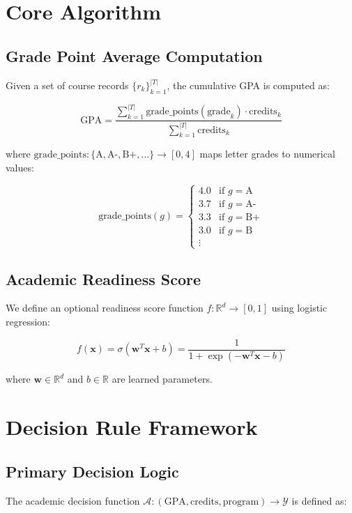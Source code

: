 \documentclass[11pt]{article}
\begin{document}
\section{Core Algorithm}

\subsection{Grade Point Average Computation}
Given a set of course records $\{r_k\}_{k=1}^{|T|}$, the cumulative GPA is computed as:

\begin{equation}
\text{GPA} = \frac{\sum_{k=1}^{|T|} \text{grade\_points}(\text{grade}_k) \cdot \text{credits}_k}{\sum_{k=1}^{|T|} \text{credits}_k}
\end{equation}

where $\text{grade\_points}: \{\text{A}, \text{A-}, \text{B+}, \ldots\} \rightarrow [0, 4]$ maps letter grades to numerical values:

\begin{equation}
\text{grade\_points}(g) = \begin{cases}
4.0 & \text{if } g = \text{A} \\
3.7 & \text{if } g = \text{A-} \\
3.3 & \text{if } g = \text{B+} \\
3.0 & \text{if } g = \text{B} \\
\vdots
\end{cases}
\end{equation}

\subsection{Academic Readiness Score}
We define an optional readiness score function $f: \mathbb{R}^d \rightarrow [0, 1]$ using logistic regression:

\begin{equation}
f(\mathbf{x}) = \sigma(\mathbf{w}^T\mathbf{x} + b) = \frac{1}{1 + \exp(-\mathbf{w}^T\mathbf{x} - b)}
\end{equation}

where $\mathbf{w} \in \mathbb{R}^d$ and $b \in \mathbb{R}$ are learned parameters.

\section{Decision Rule Framework}

\subsection{Primary Decision Logic}
The academic decision function $\mathcal{A}: (\text{GPA}, \text{credits}, \text{program}) \rightarrow \mathcal{Y}$ is defined as:
\end{document}
